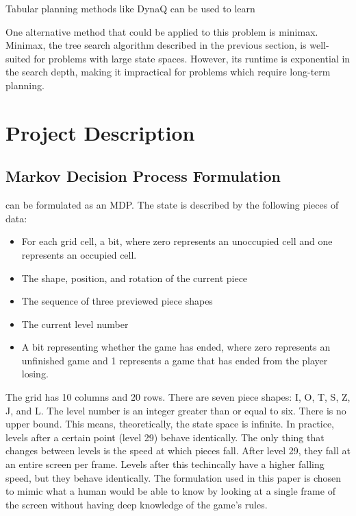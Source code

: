 \documentclass[letterpaper]{article} %
\begin{document}
Tabular planning methods like DynaQ can be used to learn

One alternative method that could be applied to this problem is minimax. Minimax, the tree search algorithm described in the previous section, is well-suited for problems with large state spaces. However, its runtime is exponential in the search depth, making it
impractical for problems which require long-term planning.

\section{Project Description}

\subsection{Markov Decision Process Formulation}
\tetris{} can be formulated as an MDP. The state is described by the following pieces of data:

\begin{itemize}
  \item{
        For each grid cell, a bit, where zero represents an unoccupied cell and one represents an occupied cell.
        }
  \item{
        The shape, position, and rotation of the current piece
        }
  \item{
        The sequence of three previewed piece shapes
        }
  \item{
        The current level number
        }
  \item{
        A bit representing whether the game has ended, where zero represents an unfinished game and 1 represents a game that has ended from the player losing.
        }
\end{itemize}

The grid has 10 columns and 20 rows. There are seven piece shapes: I, O, T, S, Z, J, and L. The level number is an integer greater than or equal to six. There is no upper bound. This means, theoretically, the state space is infinite. In practice,
levels after a certain point (level 29) behave identically. The only thing that changes between levels is the speed at which pieces fall. After level 29, they fall at an entire screen per frame. Levels after this techincally have a higher falling speed,
but they behave identically. The formulation used in this paper is chosen to mimic what a human would be able to know by looking at a single frame of the screen without having deep knowledge of the game's rules.
\end{document}
